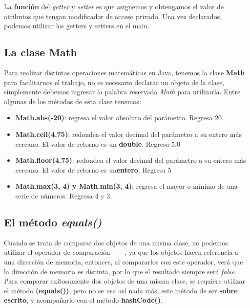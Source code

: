 La \textbf{función} del \textit{getter} y \textit{setter} es que asignemos y obtengamos el valor de atributos que tengan modificador de acceso privado. Una vez declarados, podemos utilizar los getters y setters en el main.


\subsection{La clase Math}
\hspace{0.55cm}Para realizar distintas operaciones matemáticas en Java, tenemos la clase \textbf{Math} para facilitarnos el trabajo, no es necesario declarar un objeto de la clase, simplemente debemos ingresar la palabra reservada \textit{Math} para utilizarla. Entre algunas de los métodos de esta clase tenemos:
\begin{itemize}
    \item \textbf{Math.abs(-20)}: regresa el valor absoluto del parámetro. Regresa 20.
    \item \textbf{Math.ceil(4.75)}: redondea el valor decimal del parámetro a su entero más cercano. El valor de retorno es un \textbf{double}. Regresa 5.0
    \item \textbf{Math.floor(4.75)}: redondea el valor decimal del parámetro a su entero más cercano. El valor de retorno es un\textbf{entero}. Regresa 5
    \item \textbf{Math.max(3, 4) y Math.min(3, 4)}: regresa el mayor o mínimo de una serie de números. Regresa 4 y 3.
\end{itemize}


\subsection{El método \textit{equals()}}
\hspace{0.55cm}Cuando se trata de comparar dos objetos de una misma clase, no podemos utilizar el operador de comparación \textbf{==}, ya que los objetos hacen referencia a una dirección de memoria, entonces, al compararlos con este operador, verá que la dirección de memoria es distinta, por lo que el resultado siempre será \textit{false}. Para comparar exitosamente dos objetos de una misma clase, se requiere utilizar el método \textbf{(equals())}, pero no se usa así nada más, este método de ser \textbf{sobre escrito}, y acompañarlo con el método \textbf{hashCode()}.

